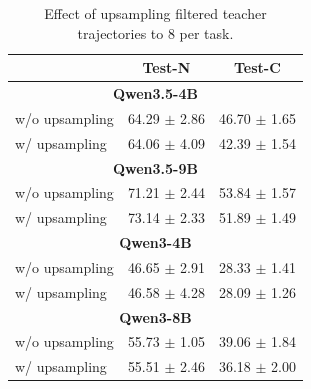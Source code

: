 \begin{table}[t]
\centering
{\begin{tabular}{lcc}
\toprule
& \textbf{Test-N} & \textbf{Test-C} \\
\midrule
\multicolumn{3}{c}{\bf Qwen3.5-4B} \\
\midrule
w/o upsampling & 64.29 $\pm$ 2.86 & 46.70 $\pm$ 1.65 \\
w/ upsampling  & 64.06 $\pm$ 4.09  &  42.39 $\pm$ 1.54 \\
\midrule
\multicolumn{3}{c}{\bf Qwen3.5-9B} \\
\midrule
w/o upsampling & 71.21 $\pm$ 2.44 & 53.84 $\pm$ 1.57  \\
w/ upsampling  & 73.14 $\pm$ 2.33 & 51.89 $\pm$ 1.49 \\
\midrule
\multicolumn{3}{c}{\bf Qwen3-4B} \\
\midrule
w/o upsampling &  46.65 $\pm$ 2.91 & 28.33 $\pm$ 1.41\\
w/ upsampling  & 46.58 $\pm$ 4.28 & 28.09 $\pm$ 1.26 \\
\midrule
\multicolumn{3}{c}{\bf Qwen3-8B} \\
\midrule
w/o upsampling &  55.73 $\pm$ 1.05 & 39.06 $\pm$ 1.84 \\
w/ upsampling  & 55.51 $\pm$ 2.46 & 36.18 $\pm$ 2.00 \\
\bottomrule
\end{tabular}
}
\caption{Effect of upsampling filtered teacher trajectories to 8 per task. }
\label{tab:upsampling}
\end{table}
